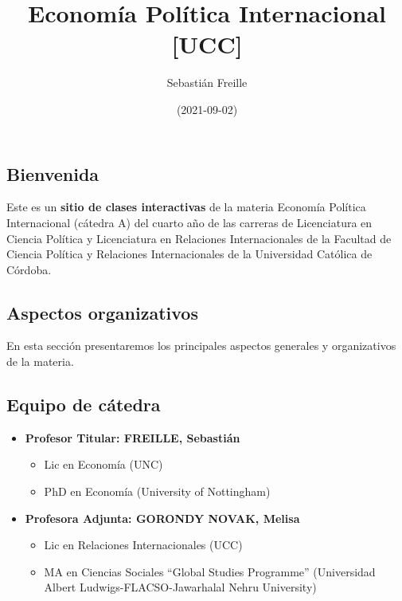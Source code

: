 \documentclass[
]{article}
\title{Economía Política Internacional {[}UCC{]}}
\author{Sebastián Freille}
\date{(2021-09-02)}
\providecommand{\tightlist}{%
  \setlength{\itemsep}{0pt}\setlength{\parskip}{0pt}}
\begin{document}
\maketitle

\hypertarget{bienvenida}{%
\subsection{Bienvenida}\label{bienvenida}}

Este es un \textbf{sitio de clases interactivas} de la materia Economía
Política Internacional (cátedra A) del cuarto año de las carreras de
Licenciatura en Ciencia Política y Licenciatura en Relaciones
Internacionales de la Facultad de Ciencia Política y Relaciones
Internacionales de la Universidad Católica de Córdoba.

\hypertarget{aspectos-organizativos}{%
\subsection{Aspectos organizativos}\label{aspectos-organizativos}}

En esta sección presentaremos los principales aspectos generales y
organizativos de la materia.

\hypertarget{equipo-de-cuxe1tedra}{%
\subsection{Equipo de cátedra}\label{equipo-de-cuxe1tedra}}

\begin{itemize}
\tightlist
\item
  \textbf{Profesor Titular: FREILLE, Sebastián}

  \begin{itemize}
  \tightlist
  \item
    Lic en Economía (UNC)
  \item
    PhD en Economía (University of Nottingham)
  \end{itemize}
\item
  \textbf{Profesora Adjunta: GORONDY NOVAK, Melisa}

  \begin{itemize}
  \tightlist
  \item
    Lic en Relaciones Internacionales (UCC)
  \item
    MA en Ciencias Sociales ``Global Studies Programme'' (Universidad
    Albert Ludwigs-FLACSO-Jawarhalal Nehru University)
  \end{itemize}
\end{itemize}
\end{document}
